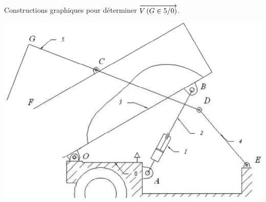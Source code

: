 \documentclass[11pt,oneside]{article}
\begin{document}
Constructions graphiques pour déterminer $\overrightarrow{V\left( {G} \in {5}/{0}\right)}$.
\begin{center}
\includegraphics[width=.7\textwidth]{png/fig5}
\end{center}

\newpage


 
\end{document}
